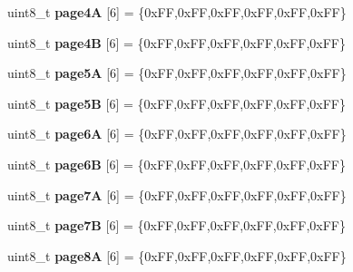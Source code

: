 \begin{DoxyCompactItemize}
\item 
\mbox{\label{structnfc_1_1cardKeys_acdb86d7d8d7b0ab0fd85fc2545a72d9b}} 
uint8\+\_\+t {\bfseries page4A} \mbox{[}6\mbox{]} = \{0x\+F\+F,0x\+F\+F,0x\+F\+F,0x\+F\+F,0x\+F\+F,0x\+F\+F\}
\item 
\mbox{\label{structnfc_1_1cardKeys_a39777a900d278e0a5470a873e613faac}} 
uint8\+\_\+t {\bfseries page4B} \mbox{[}6\mbox{]} = \{0x\+F\+F,0x\+F\+F,0x\+F\+F,0x\+F\+F,0x\+F\+F,0x\+F\+F\}
\item 
\mbox{\label{structnfc_1_1cardKeys_ab7b8cf4791b800e39219048df0ec9be7}} 
uint8\+\_\+t {\bfseries page5A} \mbox{[}6\mbox{]} = \{0x\+F\+F,0x\+F\+F,0x\+F\+F,0x\+F\+F,0x\+F\+F,0x\+F\+F\}
\item 
\mbox{\label{structnfc_1_1cardKeys_aecd64db115945e2966be64534c2c4a3e}} 
uint8\+\_\+t {\bfseries page5B} \mbox{[}6\mbox{]} = \{0x\+F\+F,0x\+F\+F,0x\+F\+F,0x\+F\+F,0x\+F\+F,0x\+F\+F\}
\item 
\mbox{\label{structnfc_1_1cardKeys_a6d52aebdd547658e9fed4f1d0eab41f7}} 
uint8\+\_\+t {\bfseries page6A} \mbox{[}6\mbox{]} = \{0x\+F\+F,0x\+F\+F,0x\+F\+F,0x\+F\+F,0x\+F\+F,0x\+F\+F\}
\item 
\mbox{\label{structnfc_1_1cardKeys_a59e01c450ae45d059d999aff4627581d}} 
uint8\+\_\+t {\bfseries page6B} \mbox{[}6\mbox{]} = \{0x\+F\+F,0x\+F\+F,0x\+F\+F,0x\+F\+F,0x\+F\+F,0x\+F\+F\}
\item 
\mbox{\label{structnfc_1_1cardKeys_abfa14036bd4fd1c856c48ef3a08bff34}} 
uint8\+\_\+t {\bfseries page7A} \mbox{[}6\mbox{]} = \{0x\+F\+F,0x\+F\+F,0x\+F\+F,0x\+F\+F,0x\+F\+F,0x\+F\+F\}
\item 
\mbox{\label{structnfc_1_1cardKeys_a1a65a0104b0ceaf6a1ce20ccf7138510}} 
uint8\+\_\+t {\bfseries page7B} \mbox{[}6\mbox{]} = \{0x\+F\+F,0x\+F\+F,0x\+F\+F,0x\+F\+F,0x\+F\+F,0x\+F\+F\}
\item 
\mbox{\label{structnfc_1_1cardKeys_a16f16b90fb5875f8fc03c584056ad668}} 
uint8\+\_\+t {\bfseries page8A} \mbox{[}6\mbox{]} = \{0x\+F\+F,0x\+F\+F,0x\+F\+F,0x\+F\+F,0x\+F\+F,0x\+F\+F\}

\end{DoxyCompactItemize}
